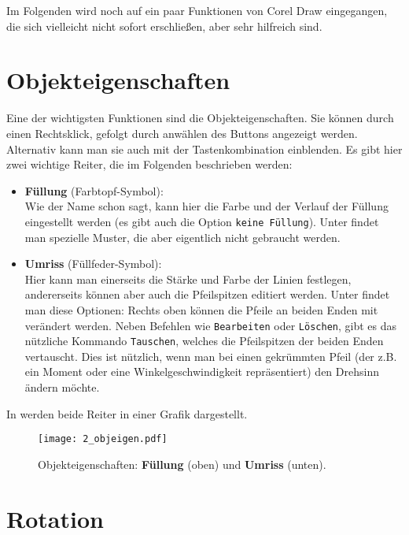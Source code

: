 Im Folgenden wird noch auf ein paar Funktionen von Corel Draw eingegangen, die
sich vielleicht nicht sofort erschließen, aber sehr hilfreich sind.

\section{Objekteigenschaften}

Eine der wichtigsten Funktionen sind die Objekteigenschaften. Sie können durch
einen Rechtsklick, gefolgt durch anwählen des Buttons 
angezeigt werden. Alternativ kann man sie auch mit der Tastenkombination
 einblenden. Es gibt hier zwei wichtige Reiter, die im
Folgenden beschrieben werden:

\begin{itemize}
  \item {\bf Füllung} (Farbtopf-Symbol):\\
    Wie der Name schon sagt, kann hier die Farbe und der Verlauf der Füllung
    eingestellt werden (es gibt auch die Option {\tt keine Füllung}). Unter
     findet man spezielle Muster, die aber eigentlich nicht
    gebraucht werden.
  \item {\bf Umriss} (Füllfeder-Symbol):\\
    Hier kann man einerseits die Stärke und Farbe der Linien festlegen,
    andererseits können aber auch die Pfeilspitzen editiert werden. Unter
     findet man diese Optionen: Rechts oben können die
    Pfeile an beiden Enden mit  verändert werden. Neben
    Befehlen wie {\tt Bearbeiten} oder {\tt Löschen}, gibt es das nützliche
    Kommando {\tt Tauschen}, welches die Pfeilspitzen der beiden Enden
    vertauscht. Dies ist nützlich, wenn man bei einen gekrümmten Pfeil (der z.B.
    ein Moment oder eine Winkelgeschwindigkeit repräsentiert) den Drehsinn
    ändern möchte.
\end{itemize}

In  werden beide Reiter in einer Grafik dargestellt.

\begin{figure}[htbp]
  \texttt{[image: 2\_objeigen.pdf]}
  \caption{Objekteigenschaften: {\bf Füllung} (oben) und {\bf Umriss} (unten).}
  \label{fig:objarrow}
\end{figure}

\clearpage
\section{Rotation}

